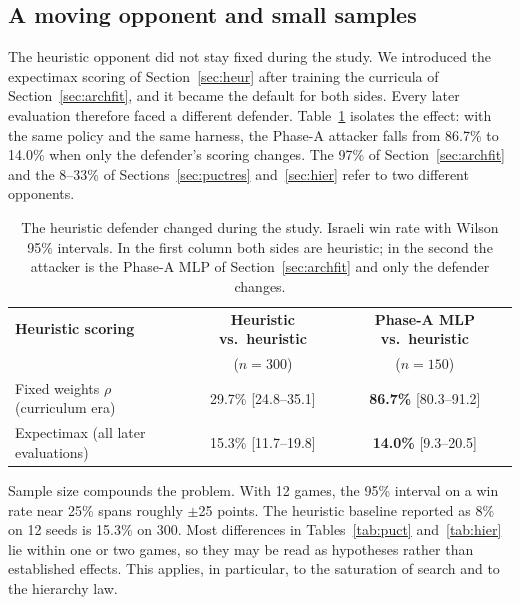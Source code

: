\documentclass{article}
\begin{document}
\subsection{A moving opponent and small samples}
\label{sec:moving}
The heuristic opponent did not stay fixed during the study. We introduced the expectimax
scoring of Section~\ref{sec:heur} after training the curricula of
Section~\ref{sec:archfit}, and it became the default for both sides. Every later evaluation
therefore faced a different defender. Table~\ref{tab:moving} isolates the effect: with
the same policy and the same harness, the Phase-A attacker falls from 86.7\% to 14.0\%
when only the defender's scoring changes. The 97\% of Section~\ref{sec:archfit} and the
8--33\% of Sections~\ref{sec:puctres} and~\ref{sec:hier} refer to two different
opponents.

\begin{table}[t]
\centering
\caption{The heuristic defender changed during the study. Israeli win rate with Wilson
95\% intervals. In the first column both sides are heuristic; in the second the
attacker is the Phase-A MLP of Section~\ref{sec:archfit} and only the defender changes.}
\label{tab:moving}
\begin{tabular}{lcc}
\toprule
\textbf{Heuristic scoring} & \textbf{Heuristic vs.\ heuristic} & \textbf{Phase-A MLP vs.\ heuristic} \\
 & ($n=300$) & ($n=150$) \\
\midrule
Fixed weights $\rho$ (curriculum era) & 29.7\% [24.8--35.1] & \textbf{86.7\%} [80.3--91.2] \\
Expectimax (all later evaluations)    & 15.3\% [11.7--19.8] & \textbf{14.0\%} [9.3--20.5] \\
\bottomrule
\end{tabular}
\end{table}

Sample size compounds the problem. With 12 games, the 95\% interval on a win rate near
25\% spans roughly $\pm$25 points. The heuristic baseline reported as 8\% on 12 seeds is
15.3\% on 300. Most differences in Tables~\ref{tab:puct} and~\ref{tab:hier} lie within one
or two games, so they may be read as hypotheses rather than established effects. This
applies, in particular, to the saturation of search and to the hierarchy law.
\end{document}
